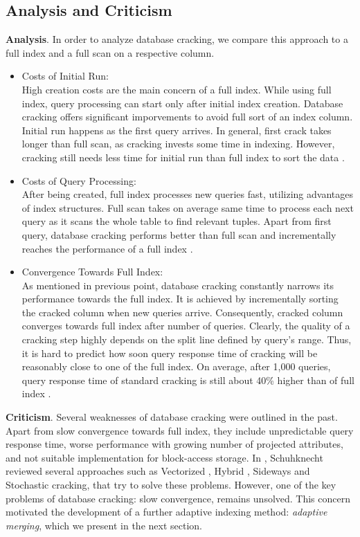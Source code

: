 \documentclass[10pt, conference, compsocconf]{IEEEtran}
\begin{document}
\subsection{Analysis and Criticism}
\label{subsec:crack_analysis}
\textbf{Analysis}. In order to analyze database cracking, we compare this approach to a full index and a full scan on a respective column.\\
\begin{itemize}
\item{Costs of Initial Run:} \\High creation costs are the main concern of a full index. While using full index, query processing can start only after initial index creation. Database cracking offers significant imporvements to avoid full sort of an index column. Initial run happens as the first query arrives. In general, first crack takes longer than full scan, as cracking invests some time in indexing. However, cracking still needs less time for initial run than full index to sort the data \cite{survey_cracking}.\\
\item{Costs of Query Processing:} \\After being created, full index processes new queries fast, utilizing advantages of index structures. Full scan takes on average same time to process each next query as it scans the whole table to find relevant tuples. Apart from first query, database cracking performs better than full scan and incrementally reaches the performance of a full index \cite{survey_cracking}.\\
\item{Convergence Towards Full Index:} \\As mentioned in previous point, database cracking constantly narrows its performance towards the full index. It is achieved by incrementally sorting the cracked column when new queries arrive. Consequently, cracked column converges towards full index after number of queries. Clearly, the quality of a cracking step highly depends on the split line defined by query's range. Thus, it is hard to predict how soon query response time of cracking will be reasonably close to one of the full index. On average, after 1,000 queries, query response time of standard cracking is still about 40\% higher than of full index \cite{eval2}.\\
\end{itemize}

\textbf{Criticism}. Several weaknesses of database cracking were outlined in the past. Apart from slow convergence towards full index, they include unpredictable query response time, worse performance with growing number of projected attributes, and not suitable implementation for block-access storage. In \cite{survey_cracking}, Schuhknecht reviewed several approaches such as Vectorized \cite{eval1}, Hybrid \cite{hybrid}, Sideways \cite{sideway} and Stochastic \cite{stochastic} cracking, that try to solve these problems. However, one of the key problems of database cracking: slow convergence, remains unsolved. This concern motivated the development of a further adaptive indexing method: \emph{adaptive merging}, which we present in the next section.
\end{document}
